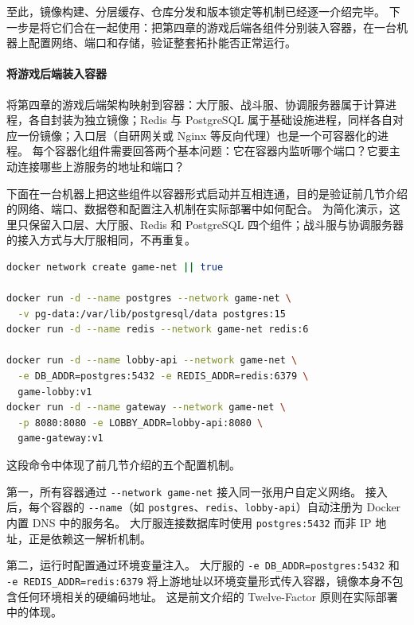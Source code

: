 至此，镜像构建、分层缓存、仓库分发和版本锁定等机制已经逐一介绍完毕。
下一步是将它们合在一起使用：把第四章的游戏后端各组件分别装入容器，在一台机器上配置网络、端口和存储，验证整套拓扑能否正常运行。

\paragraph{将游戏后端装入容器}

将第四章的游戏后端架构映射到容器：大厅服、战斗服、协调服务器属于计算进程，各自封装为独立镜像；Redis 与 PostgreSQL 属于基础设施进程，同样各自对应一份镜像；入口层（自研网关或 Nginx 等反向代理）也是一个可容器化的进程。
每个容器化组件需要回答两个基本问题：它在容器内监听哪个端口？它要主动连接哪些上游服务的地址和端口？

下面在一台机器上把这些组件以容器形式启动并互相连通，目的是验证前几节介绍的网络、端口、数据卷和配置注入机制在实际部署中如何配合。
为简化演示，这里只保留入口层、大厅服、Redis 和 PostgreSQL 四个组件；战斗服与协调服务器的接入方式与大厅服相同，不再重复。

\begin{tcolorbox}[title=单机部署示例（结构示意）]
\begin{lstlisting}[style=codeblock, language=bash]
docker network create game-net || true

docker run -d --name postgres --network game-net \
  -v pg-data:/var/lib/postgresql/data postgres:15
docker run -d --name redis --network game-net redis:6

docker run -d --name lobby-api --network game-net \
  -e DB_ADDR=postgres:5432 -e REDIS_ADDR=redis:6379 \
  game-lobby:v1
docker run -d --name gateway --network game-net \
  -p 8080:8080 -e LOBBY_ADDR=lobby-api:8080 \
  game-gateway:v1
\end{lstlisting}
\end{tcolorbox}

这段命令中体现了前几节介绍的五个配置机制。

第一，所有容器通过 \texttt{-{}-network game-net} 接入同一张用户自定义网络。
接入后，每个容器的 \texttt{-{}-name}（如 \texttt{postgres}、\texttt{redis}、\texttt{lobby-api}）自动注册为 Docker 内置 DNS 中的服务名。
大厅服连接数据库时使用 \texttt{postgres:5432} 而非 IP 地址，正是依赖这一解析机制。

第二，运行时配置通过环境变量注入。
大厅服的 \texttt{-e DB\_ADDR=postgres:5432} 和 \texttt{-e REDIS\_ADDR=redis:6379} 将上游地址以环境变量形式传入容器，镜像本身不包含任何环境相关的硬编码地址。
这是前文介绍的 Twelve-Factor 原则在实际部署中的体现。

